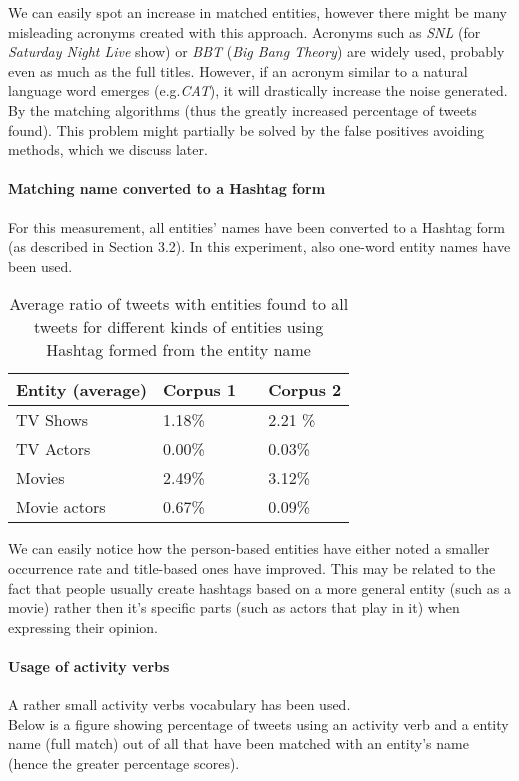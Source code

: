 We can easily spot an increase in matched entities, however there might be many
misleading acronyms created with this approach. Acronyms such as \textit{SNL}
(for \textit{Saturday Night Live} show) or  \textit{BBT} (\textit{Big Bang
Theory}) are widely used, probably even as much as the full titles. However,
if an acronym similar to a natural language word emerges (e.g.\textit{CAT}),
it will drastically increase the noise generated. By the matching algorithms
(thus the greatly increased percentage of tweets found). This problem might
partially be solved by the false positives avoiding methods, which we discuss later.

\paragraph{Matching name converted to a Hashtag form}
For this measurement, all entities' names have been converted to a Hashtag form (as described
in Section 3.2). In this experiment, also one-word entity names have been used.

\begin{center}
  \begin{table}[h!b!p!]
    \begin{tabular}{ | p{4cm} | p{2cm} | p{1cm}| p{2cm} | } \hline
      Entity (average) & Corpus 1 & & Corpus 2 \\ \hline
      TV Shows & 1.18\% & & 2.21 \% \\ \hline
      TV Actors & 0.00\% & & 0.03\% \\ \hline
      Movies & 2.49\% & & 3.12\% \\ \hline
      Movie actors & 0.67\% & & 0.09\% \\ \hline
    \end{tabular}
    \caption{Average ratio of tweets with entities found to all tweets for different kinds of entities using Hashtag formed from the entity name}
  \end{table}
\end{center}

We can easily notice how the person-based entities have either noted a smaller
occurrence rate and title-based ones have improved. This may be related to the
fact that people usually create hashtags based on a more general entity (such as
a movie) rather then it's specific parts (such as actors that play in it)
when expressing their opinion.

\paragraph{Usage of activity verbs}
A rather small activity verbs vocabulary has been used.
\\ Below is a figure showing percentage of tweets using an activity verb
and a entity name (full match) out of all that have been matched with an
entity's name (hence the greater percentage scores).

